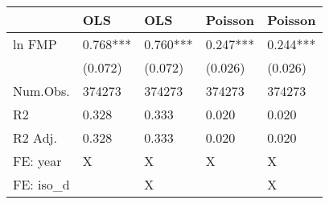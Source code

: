 \begin{tabular}{lllll}
\hline
& OLS & OLS  & Poisson & Poisson  \\ \hline
ln FMP & \num{0.768}*** & \num{0.760}*** & \num{0.247}*** & \num{0.244}*** \\
& (\num{0.072}) & (\num{0.072}) & (\num{0.026}) & (\num{0.026}) \\
Num.Obs. & \num{374273} & \num{374273} & \num{374273} & \num{374273} \\
R2 & \num{0.328} & \num{0.333} & \num{0.020} & \num{0.020} \\
R2 Adj. & \num{0.328} & \num{0.333} & \num{0.020} & \num{0.020} \\
FE: year & X & X & X & X \\
FE: iso\_d &  & X &  & X \\
\hline
\end{tabular}
